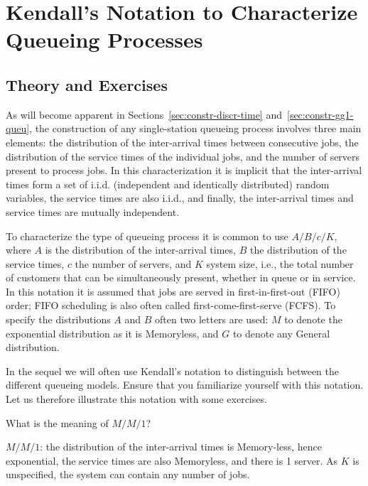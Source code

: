 
\section{Kendall's Notation to Characterize Queueing Processes}
\label{sec:kendalls-notation}




\subsection*{Theory and Exercises}

As will become apparent in Sections~\ref{sec:constr-discr-time}
and~\ref{sec:constr-gg1-queu}, the construction of any single-station queueing
process involves three main elements: 
the distribution of the
inter-arrival times between consecutive jobs, the distribution of the
service times of the individual jobs, and the number of servers
present to process jobs. In this characterization it is implicit that
the inter-arrival times form a set of i.i.d. (independent and
identically distributed) random variables, the service times are also
i.i.d., and finally, the inter-arrival times and service times are
mutually independent.

To characterize the type of queueing process it is common to use 
 $A/B/c/K$, where $A$ is the distribution of the
inter-arrival times, $B$ the distribution of the service times, $c$ the
number of servers, and $K$ system size, i.e., the total number of customers that can be simultaneously present, whether in queue or in service. In this notation it
is assumed that jobs are served in first-in-first-out (FIFO) order;
FIFO scheduling is also often called first-come-first-serve (FCFS). To specify the distributions $A$ and $B$ often two letters are used: $M$ to denote the exponential distribution as it is Memoryless, and $G$ to denote any General distribution. 

In the sequel we will often use Kendall's notation  to distinguish between the different queueing models. Ensure that you familiarize yourself with this notation. Let us therefore illustrate this notation with some exercises. 

\begin{exercise}
  What is the meaning of $M/M/1$?
  \begin{solution}
$M/M/1$: the distribution of the inter-arrival times is
  Memory-less, hence exponential, the service times are also
  Memoryless, and there is 1 server. As $K$ is unspecified, the system can contain any number of jobs.
  \end{solution}
\end{exercise}

